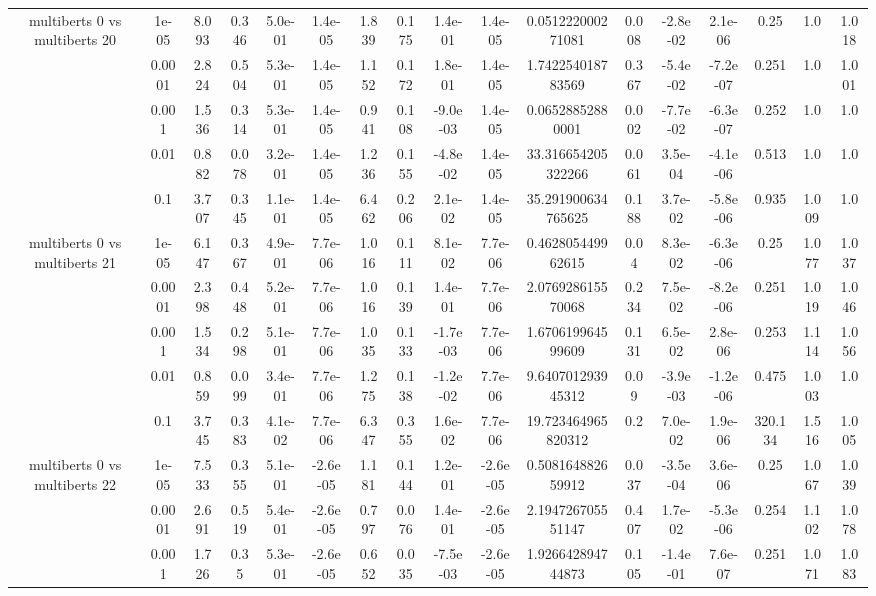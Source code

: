 \begin{tabular}{|c|c|c|c|c|c|c|c|c|c|c|c|c|c|c|c|c|}
\hline
\multirow{5}{*}{multiberts 0 vs multiberts 20} & 1e-05 & 8.093 & 0.346 & 5.0e-01 & 1.4e-05 & 1.839 & 0.175 & 1.4e-01 & 1.4e-05 & 0.051222000271081 & 0.008 & -2.8e-02 & 2.1e-06 & 0.25 & 1.0 & 1.018 \\
 & 0.0001 & 2.824 & 0.504 & 5.3e-01 & 1.4e-05 & 1.152 & 0.172 & 1.8e-01 & 1.4e-05 & 1.742254018783569 & 0.367 & -5.4e-02 & -7.2e-07 & 0.251 & 1.0 & 1.001 \\
 & 0.001 & 1.536 & 0.314 & 5.3e-01 & 1.4e-05 & 0.941 & 0.108 & -9.0e-03 & 1.4e-05 & 0.06528852880001 & 0.002 & -7.7e-02 & -6.3e-07 & 0.252 & 1.0 & 1.0 \\
 & 0.01 & 0.882 & 0.078 & 3.2e-01 & 1.4e-05 & 1.236 & 0.155 & -4.8e-02 & 1.4e-05 & 33.316654205322266 & 0.061 & 3.5e-04 & -4.1e-06 & 0.513 & 1.0 & 1.0 \\
 & 0.1 & 3.707 & 0.345 & 1.1e-01 & 1.4e-05 & 6.462 & 0.206 & 2.1e-02 & 1.4e-05 & 35.291900634765625 & 0.188 & 3.7e-02 & -5.8e-06 & 0.935 & 1.009 & 1.0 \\
\hline
\multirow{5}{*}{multiberts 0 vs multiberts 21} & 1e-05 & 6.147 & 0.367 & 4.9e-01 & 7.7e-06 & 1.016 & 0.111 & 8.1e-02 & 7.7e-06 & 0.462805449962615 & 0.04 & 8.3e-02 & -6.3e-06 & 0.25 & 1.077 & 1.037 \\
 & 0.0001 & 2.398 & 0.448 & 5.2e-01 & 7.7e-06 & 1.016 & 0.139 & 1.4e-01 & 7.7e-06 & 2.076928615570068 & 0.234 & 7.5e-02 & -8.2e-06 & 0.251 & 1.019 & 1.046 \\
 & 0.001 & 1.534 & 0.298 & 5.1e-01 & 7.7e-06 & 1.035 & 0.133 & -1.7e-03 & 7.7e-06 & 1.670619964599609 & 0.131 & 6.5e-02 & 2.8e-06 & 0.253 & 1.114 & 1.056 \\
 & 0.01 & 0.859 & 0.099 & 3.4e-01 & 7.7e-06 & 1.275 & 0.138 & -1.2e-02 & 7.7e-06 & 9.640701293945312 & 0.09 & -3.9e-03 & -1.2e-06 & 0.475 & 1.003 & 1.0 \\
 & 0.1 & 3.745 & 0.383 & 4.1e-02 & 7.7e-06 & 6.347 & 0.355 & 1.6e-02 & 7.7e-06 & 19.723464965820312 & 0.2 & 7.0e-02 & 1.9e-06 & 320.134 & 1.516 & 1.005 \\
\hline
\multirow{5}{*}{multiberts 0 vs multiberts 22} & 1e-05 & 7.533 & 0.355 & 5.1e-01 & -2.6e-05 & 1.181 & 0.144 & 1.2e-01 & -2.6e-05 & 0.508164882659912 & 0.037 & -3.5e-04 & 3.6e-06 & 0.25 & 1.067 & 1.039 \\
 & 0.0001 & 2.691 & 0.519 & 5.4e-01 & -2.6e-05 & 0.797 & 0.076 & 1.4e-01 & -2.6e-05 & 2.194726705551147 & 0.407 & 1.7e-02 & -5.3e-06 & 0.254 & 1.102 & 1.078 \\
 & 0.001 & 1.726 & 0.35 & 5.3e-01 & -2.6e-05 & 0.652 & 0.035 & -7.5e-03 & -2.6e-05 & 1.926642894744873 & 0.105 & -1.4e-01 & 7.6e-07 & 0.251 & 1.071 & 1.083 \\

\end{tabular}
